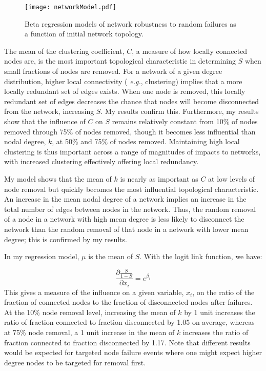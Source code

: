 
\begin{figure}[!htp]
\begin{center}
\texttt{[image: networkModel.pdf]}
\caption[Beta regression models of network robustness to random failures]{\label{fig:ch2:betaregNR}Beta regression models of network robustness to random failures as a function of initial network topology.}
\end{center}
\end{figure}


The mean of the clustering coefficient, $C$, a measure of how locally connected nodes are, is the most important topological characteristic in determining $S$ when small fractions of nodes are removed. For a network of a given degree distribution, higher local connectivity ( \emph{e.g.}, clustering) implies that a more locally redundant set of edges exists. When one node is removed, this locally redundant set of edges decreases the chance that nodes will become disconnected from the network, increasing $S$. My results confirm this. Furthermore, my results show that the influence of $C$ on $S$ remains relatively constant from 10\% of nodes removed through 75\% of nodes removed, though it becomes less influential than nodal degree, $k$, at 50\% and 75\% of nodes removed. Maintaining high local clustering is thus important across a range of magnitudes of impacts to networks, with increased clustering effectively offering local redundancy.

My model shows that the mean of $k$ is nearly as important as $C$ at low levels of node removal but quickly becomes the most influential topological characteristic. An increase in the mean nodal degree of a network implies an increase in the total number of edges between nodes in the network. Thus, the random removal of a node in a network with high mean degree is less likely to disconnect the network than the random removal of that node in a network with lower mean degree; this is confirmed by my results.

In my regression model, $\mu$ is the mean of $S$. With the logit link function, we have:

\begin{equation}
\frac{\partial \frac{S}{1-S}}{\partial x_i} = e^{\beta_i}
\end{equation}
%
This gives a measure of the influence on a given variable, $x_i$, on the ratio of the fraction of connected nodes to the fraction of disconnected nodes after failures. At the 10\% node removal level, increasing the mean of $k$ by 1 unit increases the ratio of fraction connected to fraction disconnected by 1.05 on average, whereas at 75\% node removal, a 1 unit increase in the mean of $k$ increases the ratio of fraction connected to fraction disconnected by 1.17. Note that different results would be expected for targeted node failure events where one might expect higher degree nodes to be targeted for removal first.

